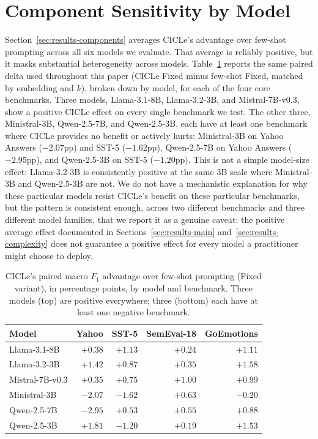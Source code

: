 \documentclass[runningheads]{llncs}
\begin{document}
%
%


%
\appendix
\section{Component Sensitivity by Model}
\label{app:components-by-model}

Section~\ref{sec:results-components} averages CICLe's advantage over
few-shot prompting across all six models we evaluate. That average is
reliably positive, but it masks substantial heterogeneity across models.
Table~\ref{tab:model-heterogeneity} reports the same paired delta used
throughout this paper (CICLe Fixed minus few-shot Fixed, matched by
embedding and $k$), broken down by model, for each of the four core
benchmarks. Three models, Llama-3.1-8B, Llama-3.2-3B, and Mistral-7B-v0.3,
show a positive CICLe effect on every single benchmark we test. The other
three, Ministral-3B, Qwen-2.5-7B, and Qwen-2.5-3B, each have at least one
benchmark where CICLe provides no benefit or actively hurts: Ministral-3B
on Yahoo Answers ($-2.07$pp) and SST-5 ($-1.62$pp), Qwen-2.5-7B on Yahoo
Answers ($-2.95$pp), and Qwen-2.5-3B on SST-5 ($-1.20$pp). This is not a
simple model-size effect: Llama-3.2-3B is consistently positive at the
same 3B scale where Ministral-3B and Qwen-2.5-3B are not. We do not have
a mechanistic explanation for why these particular models resist CICLe's
benefit on these particular benchmarks, but the pattern is consistent
enough, across two different benchmarks and three different model
families, that we report it as a genuine caveat: the positive average
effect documented in Sections~\ref{sec:results-main}
and~\ref{sec:results-complexity} does not guarantee a positive effect for
every model a practitioner might choose to deploy.

\begin{table}[h]
\centering
\begin{tabular}{|l|r|r|r|r|}
\hline
Model & Yahoo & SST-5 & SemEval-18 & GoEmotions \\
\hline
Llama-3.1-8B    & $+0.38$ & $+1.13$ & $+0.24$ & $+1.11$ \\
Llama-3.2-3B    & $+1.42$ & $+0.87$ & $+0.35$ & $+1.58$ \\
Mistral-7B-v0.3 & $+0.35$ & $+0.75$ & $+1.00$ & $+0.99$ \\
Ministral-3B    & $-2.07$ & $-1.62$ & $+0.63$ & $-0.20$ \\
Qwen-2.5-7B     & $-2.95$ & $+0.53$ & $+0.55$ & $+0.88$ \\
Qwen-2.5-3B     & $+1.81$ & $-1.20$ & $+0.19$ & $+1.53$ \\
\hline
\end{tabular}
\smallskip
\caption{CICLe's paired macro $F_1$ advantage over few-shot prompting
(Fixed variant), in percentage points, by model and benchmark. Three
models (top) are positive everywhere; three (bottom) each have at least
one negative benchmark.}
\label{tab:model-heterogeneity}
\end{table}
\end{document}
